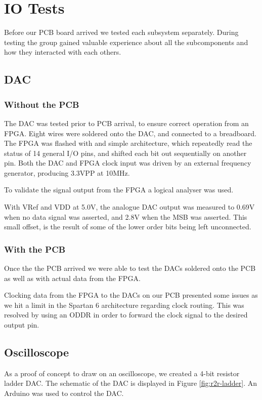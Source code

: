 \section{IO Tests}
Before our PCB board arrived we tested each subsystem separately.
During testing the group gained valuable experience about all the subcomponents and how they interacted with each others.

\subsection{DAC}

\subsubsection{Without the PCB}

The DAC was tested prior to PCB arrival, to ensure correct operation from an FPGA.
Eight wires were soldered onto the DAC, and connected to a breadboard.
The FPGA was flashed with and simple architecture, which repeatedly read the status of 14 general I/O pins, and shifted each bit out sequentially on another pin.
Both the DAC and FPGA clock input was driven by an external frequency generator, producing 3.3VPP at 10MHz.

To validate the signal output from the FPGA a logical analyser was used.

With VRef and VDD at 5.0V, the analogue DAC output was measured to 0.69V when no data signal was asserted, and 2.8V when the MSB was asserted. This small offset, is the result of some of the lower order bits being left unconnected.

\subsubsection{With the PCB}

Once the the PCB arrived we were able to test the DACs soldered onto the PCB as well as with actual data from the FPGA.

Clocking data from the FPGA to the DACs on our PCB presented some issues as we hit a limit in the Spartan 6 architecture regarding clock routing. This was resolved by using an ODDR\cite[pp. 61--65]{fpga-io} in order to forward the clock signal to the desired output pin.


\subsection{Oscilloscope}
As a proof of concept to draw on an oscilloscope, we created a 4-bit resistor ladder DAC. The schematic of the DAC is displayed in Figure \ref{fig:r2r-ladder}.
An Arduino was used to control the DAC.

